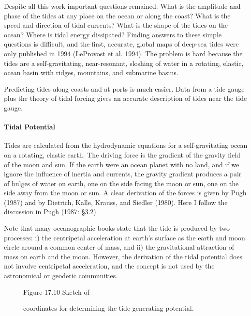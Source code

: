 Despite all this work important questions remained: What is the
amplitude and phase of the tides at any place on the ocean or along
the coast? What is the speed and direction of tidal currents?  What is
the shape of the tides on the ocean?  Where is tidal energy
dissipated? Finding answers to these simple questions is difficult,
and the first, accurate, global maps of deep-sea tides were only
published in 1994 (LeProvost et al. 1994). The problem is hard because
the tides are a self-gravitating, near-resonant, sloshing of water in
a rotating, elastic, ocean basin with ridges, mountains, and submarine
basins.

Predicting tides along coasts and at ports is much easier. Data from a
tide gauge plus the theory of tidal forcing gives an accurate
description of tides near the tide gauge.

\paragraph{Tidal Potential}
Tides are calculated from the hydrodynamic
equations for a self-gravitating ocean on a rotating, elastic
earth. The driving force is the gradient of the gravity field of the
moon and sun. If the earth were an ocean planet with no
land, and if we ignore the influence of inertia and currents, the
gravity gradient produces a pair of bulges of water on earth, one on
the side facing the moon or sun, one on the side away from the moon or
sun. A clear derivation of the forces is given by Pugh (1987) and by
Dietrich, Kalle, Krauss, and Siedler (1980). Here I follow the
discussion in Pugh (1987: \S 3.2).

Note that many oceanographic books state that the tide is produced by
two processes: i) the centripetal acceleration at earth's surface as
the earth and moon circle around a common center of mass, and ii) the
gravitational attraction of mass on earth and the moon. However, the
derivation of the tidal potential does not involve centripetal
acceleration, and the concept is not used by the astronomical or
geodetic communities.

\begin{figure}[h!]
\footnotesize
\centering
Figure 17.10 Sketch of \rule{0mm}{4ex}coordinates for determining the
tide-generating potential.

\label{fig:tidesketch}
\vspace{-1ex}
\end{figure}

